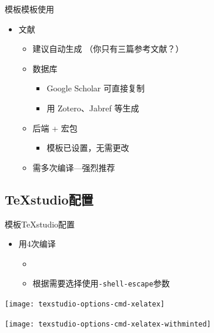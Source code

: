 \documentclass[xcolor=svgnames, t, aspectratio=169]{ctexbeamer}
\begin{document}
\begin{frame}{\nwafuthesis 模板}{模板使用}
  \stretchon
  \begin{itemize}
  \item 文献
    \begin{itemize}
    \item 建议自动生成 （你只有三篇参考文献？）
    \item {} 数据库

      \begin{itemize}
      \item Google Scholar 可直接复制
      \item 用 Zotero、Jabref 等生成
      \end{itemize}

    \item {} 后端 +  宏包

      \begin{itemize}
      \item 模板已设置，\alert{无需更改}
      \end{itemize} 

    \item 需多次编译---强烈推荐 
    \end{itemize}
  \end{itemize}
  \stretchoff
\end{frame}

\subsection[TeXstudio]{TeXstudio配置}
\begin{frame}{\nwafuthesis 模板}{TeXstudio配置}
  \stretchon
  \begin{itemize}
  \item 用\XeLaTeX \alert{4次}编译
    \begin{itemize}
    \item {}
    \item 根据需要选择使用\texttt{-shell-escape}参数
    \end{itemize}
  \end{itemize}
  \centering
  \begin{annotatedFigure}
    {\texttt{[image: texstudio-options-cmd-xelatex]}}
  \end{annotatedFigure}
  \begin{annotatedFigure}
    {\texttt{[image: texstudio-options-cmd-xelatex-withminted]}}
  \end{annotatedFigure}  
  \stretchoff
\end{frame}
\end{document}
